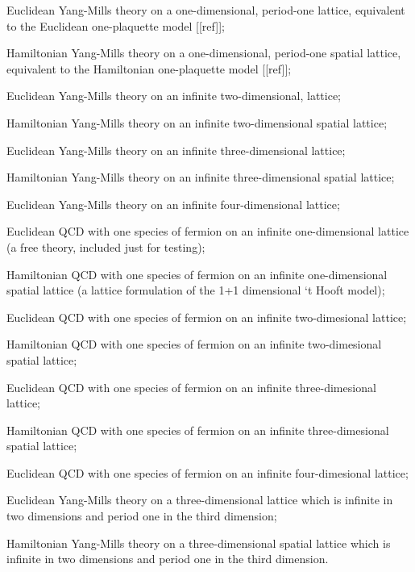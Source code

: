 \documentclass [12pt]{article}
\makeatletter
\renewcommand{\tt}{\begingroup\catcode`_=12\def\_{\string_}\tt@}
\newcommand{\tt@}[1]{\texttt{#1}\endgroup}
\makeatother
\begin{document}
\begin{description}\advance\itemsep -3pt
\item [\tt {YM1e}]
    Euclidean Yang-Mills theory on a one-dimensional, period-one lattice,
    equivalent to the Euclidean one-plaquette model [[ref]];
\item [\tt {YM1h}]
    Hamiltonian Yang-Mills theory on a one-dimensional, period-one spatial lattice,
    equivalent to the Hamiltonian one-plaquette model [[ref]];
\item [\tt {YM2e}]
    Euclidean Yang-Mills theory on an infinite two-dimensional, lattice;
\item [\tt {YM2h}]
    Hamiltonian Yang-Mills theory on an infinite two-dimensional spatial lattice;
\item [\tt {YM3e}]
    Euclidean Yang-Mills theory on an infinite three-dimensional lattice;
\item [\tt {YM3h}]
    Hamiltonian Yang-Mills theory on an infinite three-dimensional spatial lattice;
\item [\tt {YM4e}]
    Euclidean Yang-Mills theory on an infinite four-dimensional lattice;
\item [\tt {QCD1e}]
    Euclidean QCD with one species of fermion on an infinite one-dimensional lattice
    (a free theory, included just for testing);
\item [\tt {QCD1h}]
    Hamiltonian QCD with one species of fermion on an infinite one-dimensional
    spatial lattice
    (a lattice formulation of the 1+1 dimensional `t Hooft model);
\item [\tt {QCD2e}]
    Euclidean QCD with one species of fermion on an infinite two-dimesional lattice;
\item [\tt {QCD2h}]
    Hamiltonian QCD with one species of fermion on an infinite two-dimesional 
    spatial lattice;
\item [\tt {QCD3e}]
    Euclidean QCD with one species of fermion on an infinite three-dimesional lattice;
\item [\tt {QCD3h}]
    Hamiltonian QCD with one species of fermion on an infinite three-dimesional 
    spatial lattice;
\item [\tt {QCD4e}]
    Euclidean QCD with one species of fermion on an infinite four-dimesional lattice;
\item [\tt {YM3ep}]
    Euclidean Yang-Mills theory on a three-dimensional lattice
    which is infinite in two dimensions and period one in the third dimension;
\item [\tt {YM3hp}]
    Hamiltonian Yang-Mills theory on a three-dimensional spatial lattice
    which is infinite in two dimensions and period one in the third dimension.
\end{description}
\end{document}
